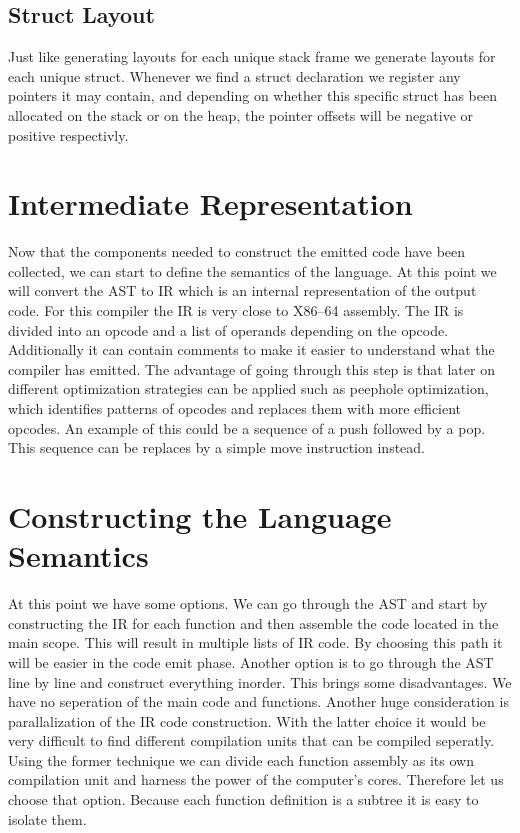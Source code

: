 \subsection{Struct Layout}

Just like generating layouts for each unique stack frame we generate layouts for each unique struct. Whenever we find a struct declaration we register any pointers it may contain, and depending on whether this specific struct has been allocated on the stack or on the heap, the pointer offsets will be negative or positive respectivly. 

\section{Intermediate Representation}

Now that the components needed to construct the emitted code have been collected, we can start to define the semantics of the language. At this point we will convert the AST to IR which is an internal representation of the output code. For this compiler the IR is very close to X86--64 assembly. The IR is divided into an opcode and a list of operands depending on the opcode. Additionally it can contain comments to make it easier to understand what the compiler has emitted. The advantage of going through this step is that later on different optimization strategies can be applied such as peephole optimization, which identifies patterns of opcodes and replaces them with more efficient opcodes. An example of this could be a sequence of a push followed by a pop. This sequence can be replaces by a simple move instruction instead.  

\section{Constructing the Language Semantics}

At this point we have some options. We can go through the AST and start by constructing the IR for each function and then assemble the code located in the main scope. This will result in multiple lists of IR code. By choosing this path it will be easier in the code emit phase. Another option is to go through the AST line by line and construct everything inorder. This brings some disadvantages. We have no seperation of the main code and functions. Another huge consideration is parallalization of the IR code construction. With the latter choice it would be very difficult to find different compilation units that can be compiled seperatly. Using the former technique we can divide each function assembly as its own compilation unit and harness the power of the computer's cores. Therefore let us choose that option. Because each function definition is a subtree it is easy to isolate them. 


